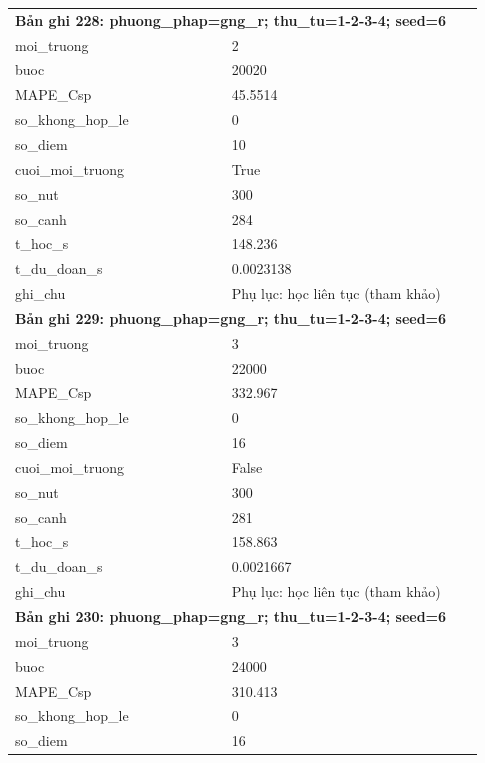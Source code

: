 \begin{longtable}{p{0.43\linewidth}p{0.50\linewidth}}
\midrule
\multicolumn{2}{p{0.95\linewidth}}{\textbf{Bản ghi 228: phuong\_phap=gng\_r; thu\_tu=1-2-3-4; seed=6}} \\
moi\_\allowbreak truong & 2 \\
buoc & 20020 \\
MAPE\_\allowbreak Csp & 45.5514 \\
so\_\allowbreak khong\_\allowbreak hop\_\allowbreak le & 0 \\
so\_\allowbreak diem & 10 \\
cuoi\_\allowbreak moi\_\allowbreak truong & True \\
so\_\allowbreak nut & 300 \\
so\_\allowbreak canh & 284 \\
t\_\allowbreak hoc\_\allowbreak s & 148.236 \\
t\_\allowbreak du\_\allowbreak doan\_\allowbreak s & 0.0023138 \\
ghi\_\allowbreak chu & Phụ lục: học liên tục (tham khảo) \\
\midrule
\multicolumn{2}{p{0.95\linewidth}}{\textbf{Bản ghi 229: phuong\_phap=gng\_r; thu\_tu=1-2-3-4; seed=6}} \\
moi\_\allowbreak truong & 3 \\
buoc & 22000 \\
MAPE\_\allowbreak Csp & 332.967 \\
so\_\allowbreak khong\_\allowbreak hop\_\allowbreak le & 0 \\
so\_\allowbreak diem & 16 \\
cuoi\_\allowbreak moi\_\allowbreak truong & False \\
so\_\allowbreak nut & 300 \\
so\_\allowbreak canh & 281 \\
t\_\allowbreak hoc\_\allowbreak s & 158.863 \\
t\_\allowbreak du\_\allowbreak doan\_\allowbreak s & 0.0021667 \\
ghi\_\allowbreak chu & Phụ lục: học liên tục (tham khảo) \\
\midrule
\multicolumn{2}{p{0.95\linewidth}}{\textbf{Bản ghi 230: phuong\_phap=gng\_r; thu\_tu=1-2-3-4; seed=6}} \\
moi\_\allowbreak truong & 3 \\
buoc & 24000 \\
MAPE\_\allowbreak Csp & 310.413 \\
so\_\allowbreak khong\_\allowbreak hop\_\allowbreak le & 0 \\
so\_\allowbreak diem & 16 \\

\end{longtable}

